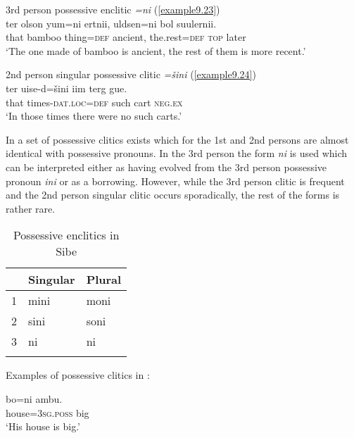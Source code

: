 \documentclass[output=paper,colorlinks,citecolor=brown]{langscibook}
\begin{document}
\ea
    \label{example9.23}3rd person possessive enclitic \textit{=ni} (\ref{example9.23})\\
    \gll ter 	olson 		yum=ni 		ertnii, 		uldsen=ni 	bol 	suulernii.\\
    that 	bamboo 	thing=\textsc{def} 		ancient, 	the.rest=\textsc{def}	\textsc{top} 	later\\
    \glt `The one made of bamboo is ancient, the rest of them is more recent.'\\
    \z 

\ea
    \label{example9.24}2nd person singular possessive clitic \textit{=šini} (\ref{example9.24})\\
    \gll ter 	uise-d=šini 			iim 	terg 	gue.\\
    that 	times-\textsc{dat.loc}=\textsc{def} 	such 	cart  	\textsc{neg.ex}\\
    \glt `In those times there were no such carts.'\\
    \z


In  a set of possessive clitics exists which for the 1st and 2nd persons are almost identical with possessive pronouns. In the 3rd person the form \textit{ni} is used which can be interpreted either as having evolved from the  3rd person possessive pronoun \textit{ini} or as a  borrowing. However, while the 3rd person clitic is frequent and the 2nd person singular clitic occurs sporadically, the rest of the forms is rather rare.

\begin{table}
\begin{tabular}{ l l l }
  \lsptoprule
& Singular &	Plural\\
  \midrule
1 &	mini &	moni\\
2 &	sini &	soni\\
3 &	ni &	ni\\
  \lspbottomrule
\end{tabular}
\caption{Possessive enclitics in Sibe}
\label{table:9.3}
\end{table}

Examples of possessive clitics in :

\ea
    \label{example9.25}
    \gll bo=ni		    	ambu.\\
    house=3\textsc{sg.poss} 	big\\
    \glt `His house is big.'\\
    \z
\end{document}
